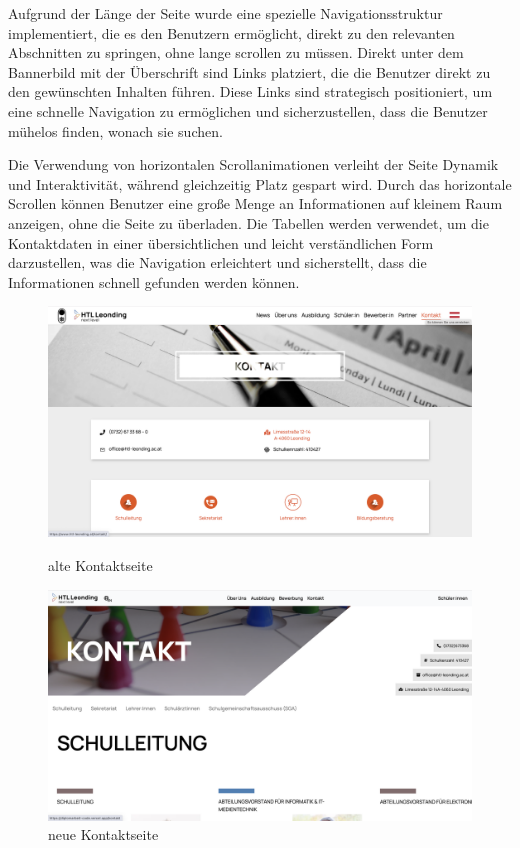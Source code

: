 Aufgrund der Länge der Seite wurde eine spezielle Navigationsstruktur implementiert, die es den Benutzern ermöglicht,
 direkt zu den relevanten Abschnitten zu springen, ohne lange scrollen zu müssen. Direkt unter dem Bannerbild mit der Überschrift 
 sind Links platziert, die die Benutzer direkt zu den gewünschten Inhalten führen. Diese Links sind strategisch positioniert, 
 um eine schnelle Navigation zu ermöglichen und sicherzustellen, dass die Benutzer mühelos finden, wonach sie suchen.

Die Verwendung von horizontalen Scrollanimationen verleiht der Seite Dynamik und Interaktivität, während gleichzeitig 
Platz gespart wird. Durch das horizontale Scrollen können Benutzer eine große Menge an Informationen auf kleinem Raum anzeigen, ohne
 die Seite zu überladen. Die Tabellen werden verwendet, um die Kontaktdaten in einer übersichtlichen und leicht verständlichen Form 
 darzustellen, was die Navigation erleichtert und sicherstellt, dass die Informationen schnell gefunden werden können.

 \begin{figure}
   \begin{minipage}[b]{.4\linewidth} 
      \includegraphics[width=\linewidth]{pics/alt-kontakt.png}
      \caption{alte Kontaktseite}
      \label{fig:impl:alt:kontakt}
   \end{minipage}
   \hspace{.05\linewidth}
   \begin{minipage}[b]{.4\linewidth}
      \includegraphics[width=\linewidth]{pics/neu-kontakt.png}
      \caption{neue Kontaktseite}
      \label{fig:impl:neu:kontakt}
   \end{minipage}
\end{figure}


